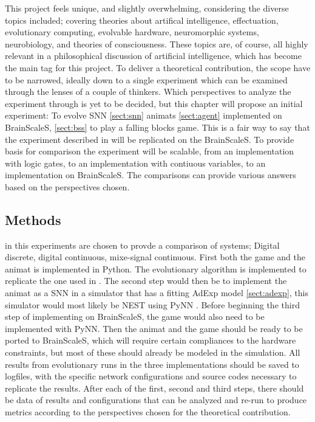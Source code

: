 This project feels unique, and slightly overwhelming, considering the diverse topics included; covering theories about artifical intelligence, effectuation, evolutionary computing, evolvable hardware, neuromorphic systems, neurobiology, and theories of consciousness.
These topics are, of course, all highly relevant in a philosophical discussion of artificial intelligence, which has become the main tag for this project.
To deliver a theoretical contribution, the scope have to be narrowed, ideally down to a single experiment which can be examined through the lenses of a couple of thinkers.
Which perspectives to analyze the experiment through is yet to be decided, but this chapter will propose an initial experiment:
To evolve SNN \vref{sect:snn} animats \vref{sect:agent} implemented on BrainScaleS, \vref{sect:bss} to play a falling blocks game.
This is a fair way to say that the experiment described in \cite{albantakis_evolution_2014} will be replicated on the BrainScaleS.
To provide basis for comparison the experiment will be scalable, from an implementation with logic gates, to an implementation with contiuous variables, to an implementation on BrainScaleS.
The comparisons can provide various answers based on the perspectives chosen.

\subsection{Methods} in this experiments are chosen to provde a comparison of systems; Digital discrete, digital continuous, mixe-signal continuous.
First both the game and the animat is implemented in Python.
The evolutionary algorithm is implemented to replicate the one used in \cite{albantakis_evolution_2014}.
The second step would then be to implement the animat as a SNN in a simulator that has a fitting AdExp model \vref{sect:adexp},
this simulator would most likely be NEST \cite{fardet_nest_2020} using PyNN \cite{davison_pynn_2009}.
Before beginning the third step of implementing on BrainScaleS, the game would also need to be implemented with PyNN.
Then the animat and the game should be ready to be ported to BrainScaleS, which will require certain compliances to the hardware constraints,
but most of these should already be modeled in the simulation.
All results from evolutionary runs in the three implementations should be saved to logfiles, with the specific network configurations and source codes necessary to replicate the results.
After each of the first, second and third steps, there should be data of results and configurations that can be analyzed and re-run to produce metrics according to the perspectives chosen for the theoretical contribution.


